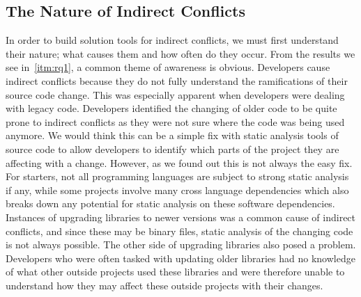 \documentclass[conference]{IEEEtran}
\begin{document}
\subsection{The Nature of Indirect Conflicts}

In order to build solution tools for indirect conflicts, we must first understand their nature; what causes them and how often do they 
occur. From the results we see in~\ref{itm:rq1}, a common theme of awareness is obvious. Developers cause indirect conflicts because they do not
fully understand the ramifications of their source code change. This was especially apparent when developers were dealing with legacy code.
Developers identified the changing of older code to be quite prone to indirect conflicts as they were not sure where the code was being used
anymore. We would think this can be a simple fix with static analysis tools of source
code to allow developers to identify which parts of the project they are affecting with a change. However, as we found out this is not always
the easy fix. For starters, not all programming languages are subject to strong static analysis if any, while some projects involve many
cross language dependencies which also breaks down any potential for static analysis on these software dependencies. 
Instances of upgrading libraries to newer versions was a common cause of indirect conflicts, and since these may be binary files,
static analysis of the changing code is not always possible. The other side of upgrading libraries also posed a problem. Developers who were often
tasked with updating older libraries had no knowledge of what other outside projects used these libraries and were therefore unable to understand
how they may affect these outside projects with their changes.
\end{document}
